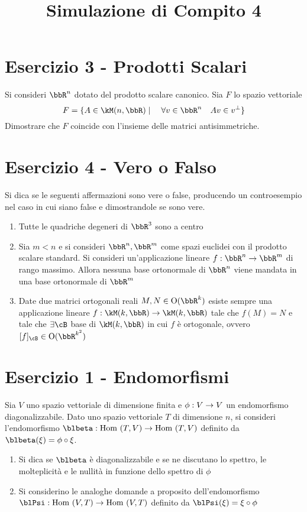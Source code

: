 \documentclass[a4paper,NoNotes,GeneralMath]{stdmdoc}
\begin{document}
	\section*{Esercizio 3 - Prodotti Scalari}
	Si consideri $\bbR^n$ dotato del prodotto scalare canonico. Sia $F$ lo spazio vettoriale $$ F = \{ A \in \kM(n,\bbR) \mid \quad \forall v \in \bbR^n \quad Av \in v^{\bot}\}$$
	Dimostrare che $F$ coincide con l'insieme delle matrici antisimmetriche.

	\section*{Esercizio 4 - Vero o Falso}
	Si dica se le seguenti affermazioni sono vere o false, producendo un controesempio nel caso in cui siano false e dimostrandole se sono vere.
	\begin{enumerate}
		\item Tutte le quadriche degeneri di $\bbR^3$ sono a centro
		\item Sia $m < n$ e si consideri $\bbR^n, \bbR^m$ come spazi euclidei con il prodotto scalare standard. Si consideri un'applicazione lineare $f: \bbR^n \rar \bbR^m$ di rango massimo. Allora nessuna base ortonormale di $\bbR^n$ viene mandata in una base ortonormale di $\bbR^m$
		\item Date due matrici ortogonali reali $M, N \in \Ort(\bbR^k)$ esiste sempre una applicazione lineare $f: \kM(k, \bbR) \rar \kM(k, \bbR)$ tale che $f(M) = N$ e tale che $\exists \cB$ base di $\kM(k, \bbR)$ in cui $f$ è ortogonale, ovvero $[f]_\cB \in \Ort(\bbR^{k^2})$ 
	\end{enumerate}

	\newpage
	\title{Simulazione di Compito 4}
	\section*{Esercizio 1 - Endomorfismi}
	Sia $V$ uno spazio vettoriale di dimensione finita e $\phi: V \rightarrow V$ un endomorfismo diagonalizzabile. Dato uno spazio vettoriale $T$ di dimensione $n$, si consideri l'endomorfismo $\blbeta: \text{Hom }(T,V) \rar \text{Hom }(T,V)$ definito da $\blbeta(\xi) = \phi\circ\xi$.
	\begin{enumerate}
		\item Si dica se $\blbeta$ è diagonalizzabile e se ne discutano lo spettro, le molteplicità e le nullità in funzione dello spettro di $\phi$
		\item Si considerino le analoghe domande a proposito dell'endomorfismo $\blPsi: \text{Hom }(V,T) \rar \text{Hom }(V,T)$ definito da $\blPsi(\xi) = \xi\circ\phi$
	\end{enumerate}
\end{document}
